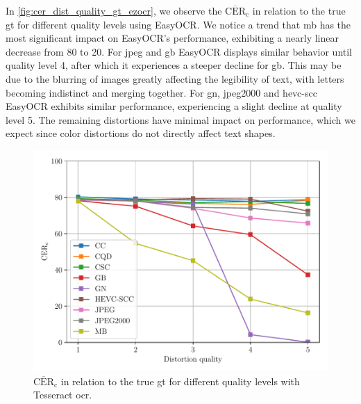 In \autoref{fig:cer_dist_quality_gt_ezocr}, we observe the $\overline{\text{CER}}_{\text{c}}$ in relation to the true \gls{gt} for different quality levels using EasyOCR.
We notice a trend that \gls{mb} has the most significant impact on EasyOCR's performance, exhibiting a nearly linear decrease from 80 to 20.
For \gls{jpeg} and \gls{gb} EasyOCR displays similar behavior until quality level 4, after which it experiences a steeper decline for \gls{gb}.
This may be due to the blurring of images greatly affecting the legibility of text, with letters becoming indistinct and merging together.
For \gls{gn}, \gls{jpeg}2000 and \gls{hevc}-\gls{scc} EasyOCR exhibits similar performance, experiencing a slight decline at quality level 5.
The remaining distortions have minimal impact on performance, which we expect since color distortions do not directly affect text shapes.

\begin{figure}[h!]
\centering
    \includegraphics[width=\textwidth]{../../images/analyze/cer_dist_quality_gt_tess.pdf}
    \caption{$\overline{\text{CER}}_{\text{c}}$ in relation to the true \gls{gt} for different quality levels with Tesseract \gls{ocr}.}
\label{fig:cer_dist_quality_gt_tesseract}
\end{figure}

